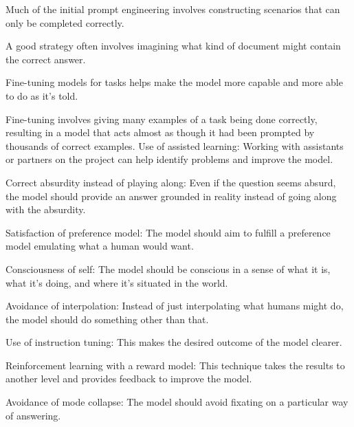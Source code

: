 Much of the initial prompt engineering involves constructing scenarios that can only be completed correctly.

A good strategy often involves imagining what kind of document might contain the correct answer.

Fine-tuning models for tasks helps make the model more capable and more able to do as it's told.

Fine-tuning involves giving many examples of a task being done correctly, resulting in a model that acts almost as though it had been prompted by thousands of correct examples.
Use of assisted learning: Working with assistants or partners on the project can help identify problems and improve the model.

Correct absurdity instead of playing along: Even if the question seems absurd, the model should provide an answer grounded in reality instead of going along with the absurdity.

Satisfaction of preference model: The model should aim to fulfill a preference model emulating what a human would want.

Consciousness of self: The model should be conscious in a sense of what it is, what it's doing, and where it's situated in the world.

Avoidance of interpolation: Instead of just interpolating what humans might do, the model should do something other than that.

Use of instruction tuning: This makes the desired outcome of the model clearer.

Reinforcement learning with a reward model: This technique takes the results to another level and provides feedback to improve the model.

Avoidance of mode collapse: The model should avoid fixating on a particular way of answering.
